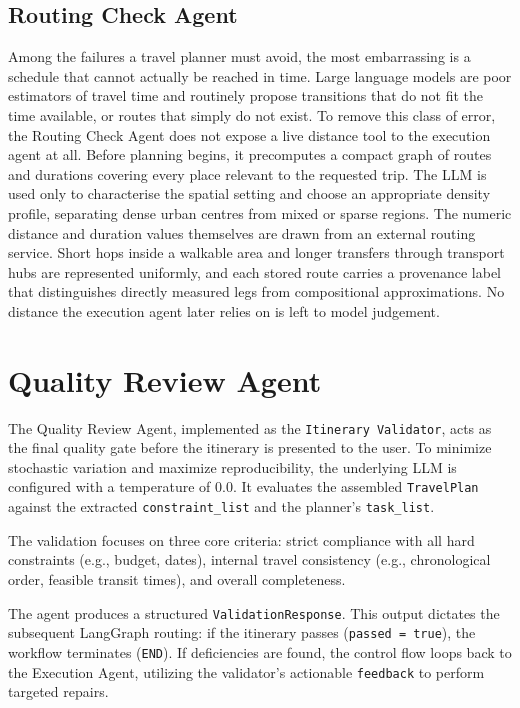 \documentclass[a4paper,oneside,bibliography=totoc]{scrbook}
\begin{document}
\subsection{Routing Check Agent}
Among the failures a travel planner must avoid, the most embarrassing is a schedule that cannot actually be reached in time. Large language models are poor estimators of travel time and routinely propose transitions that do not fit the time available, or routes that simply do not exist. To remove this class of error, the Routing Check Agent does not expose a live distance tool to the execution agent at all. Before planning begins, it precomputes a compact graph of routes and durations covering every place relevant to the requested trip. The LLM is used only to characterise the spatial setting and choose an appropriate density profile, separating dense urban centres from mixed or sparse regions. The numeric distance and duration values themselves are drawn from an external routing service. Short hops inside a walkable area and longer transfers through transport hubs are represented uniformly, and each stored route carries a provenance label that distinguishes directly measured legs from compositional approximations. No distance the execution agent later relies on is left to model judgement.

\section{Quality Review Agent}

The Quality Review Agent, implemented as the \texttt{Itinerary Validator}, acts as the final quality gate before the itinerary is presented to the user. To minimize stochastic variation and maximize reproducibility, the underlying LLM is configured with a temperature of 0.0. It evaluates the assembled \texttt{TravelPlan} against the extracted \texttt{constraint\_list} and the planner's \texttt{task\_list}.

The validation focuses on three core criteria: strict compliance with all hard constraints (e.g., budget, dates), internal travel consistency (e.g., chronological order, feasible transit times), and overall completeness.

The agent produces a structured \texttt{ValidationResponse}. This output dictates the subsequent LangGraph routing: if the itinerary passes (\texttt{passed = true}), the workflow terminates (\texttt{END}). If deficiencies are found, the control flow loops back to the Execution Agent, utilizing the validator's actionable \texttt{feedback} to perform targeted repairs.
\end{document}
